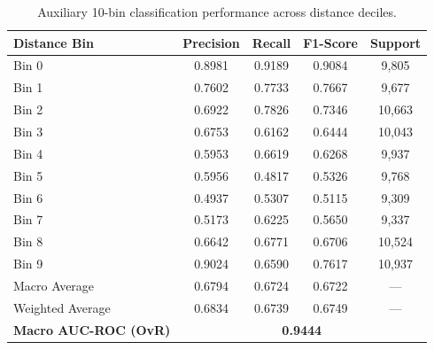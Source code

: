\begin{table}[H]
\centering
\small
\begin{tabular}{lcccc}
\toprule
\textbf{Distance Bin} & \textbf{Precision} & \textbf{Recall} & \textbf{F1-Score} & \textbf{Support} \\
\midrule
Bin 0 & 0.8981 & 0.9189 & 0.9084 & 9,805 \\
Bin 1 & 0.7602 & 0.7733 & 0.7667 & 9,677 \\
Bin 2 & 0.6922 & 0.7826 & 0.7346 & 10,663 \\
Bin 3 & 0.6753 & 0.6162 & 0.6444 & 10,043 \\
Bin 4 & 0.5953 & 0.6619 & 0.6268 & 9,937 \\
Bin 5 & 0.5956 & 0.4817 & 0.5326 & 9,768 \\
Bin 6 & 0.4937 & 0.5307 & 0.5115 & 9,309 \\
Bin 7 & 0.5173 & 0.6225 & 0.5650 & 9,337 \\
Bin 8 & 0.6642 & 0.6771 & 0.6706 & 10,524 \\
Bin 9 & 0.9024 & 0.6590 & 0.7617 & 10,937 \\
\midrule
Macro Average & 0.6794 & 0.6724 & 0.6722 & --- \\
Weighted Average & 0.6834 & 0.6739 & 0.6749 & --- \\
\textbf{Macro AUC-ROC (OvR)} & \multicolumn{4}{c}{\textbf{0.9444}} \\
\bottomrule
\end{tabular}
\caption{Auxiliary 10-bin classification performance across distance deciles.}
\label{tab:classification_results}
\end{table}
